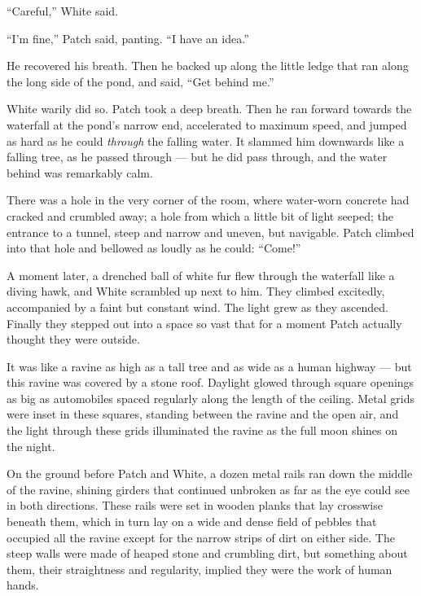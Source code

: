 \documentclass[ebook,oneside,openany,17pt]{memoir}
\newenvironment{tolerant}[1]{%
  \par\tolerance=#1\relax
}{%
  \par
}
\begin{document}
“Careful,” White said.

“I’m fine,” Patch said, panting. “I have an idea.”

\begin{tolerant}{500}
He recovered his breath. Then he backed up along the little ledge that
ran along the long side of the pond, and said, “Get behind me.”
\end{tolerant}

White warily did so. Patch took a deep breath. Then he ran forward
towards the waterfall at the pond’s narrow end, accelerated to maximum
speed, and jumped as hard as he could \emph{through }the falling
water. It slammed him downwards like a falling tree, as he passed
through — but he did pass through, and the water behind was remarkably
calm.

\begin{tolerant}{500}
There was a hole in the very corner of the room, where water-worn
concrete had cracked and crumbled away; a hole from which a little bit
of light seep\-ed; the entrance to a tunnel, steep and narrow and
uneven, but navigable. Patch climbed into that hole and bellowed as
loudly as he could: “Come!”
\end{tolerant}

A moment later, a drenched ball of white fur flew through the
waterfall like a diving hawk, and White scrambled up next to him. They
climbed excitedly, accompanied by a faint but constant wind. The light
grew as they ascended. Finally they stepped out into a space so vast
that for a moment Patch actually thought they were outside.

It was like a ravine as high as a tall tree and as wide as a human
highway — but this ravine was covered by a stone roof. Daylight glowed
through square openings as big as automobiles spaced regularly along
the length of the ceiling. Metal grids were inset in these squares,
standing between the ravine and the open air, and the light through
these grids illuminated the ravine as the full moon shines on the
night.

On the ground before Patch and White, a dozen metal rails ran down the
middle of the ravine, shining girders that continued unbroken as far
as the eye could see in both directions. These rails were set in
wooden planks that lay crosswise beneath them, which in turn lay on a
wide and dense field of pebbles that occupied all the ravine except
for the narrow strips of dirt on either side. The steep walls were
made of heaped stone and crumbling dirt, but something about them,
their straightness and regularity, implied they were the work of human
hands.
\end{document}
